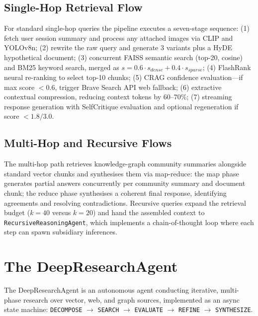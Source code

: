 \subsection{Single-Hop Retrieval Flow}
\label{subsec:single-hop}

For standard single-hop queries the pipeline executes a seven-stage sequence: (1) fetch user session summary and process any attached images via CLIP and YOLOv8n; (2) rewrite the raw query and generate 3 variants plus a HyDE hypothetical document; (3) concurrent FAISS semantic search (top-20, cosine) and BM25 keyword search, merged as $s = 0.6 \cdot s_{dense} + 0.4 \cdot s_{sparse}$; (4) FlashRank neural re-ranking to select top-10 chunks; (5) CRAG confidence evaluation---if max score $< 0.6$, trigger Brave Search API web fallback; (6) extractive contextual compression, reducing context tokens by 60--70\%; (7) streaming response generation with SelfCritique evaluation and optional regeneration if score $< 1.8/3.0$.

\subsection{Multi-Hop and Recursive Flows}
\label{subsec:multihop}

The multi-hop path retrieves knowledge-graph community summaries alongside standard vector chunks and synthesises them via map-reduce: the map phase generates partial answers concurrently per community summary and document chunk; the reduce phase synthesises a coherent final response, identifying agreements and resolving contradictions. Recursive queries expand the retrieval budget ($k=40$ versus $k=20$) and hand the assembled context to \texttt{RecursiveReasoningAgent}, which implements a chain-of-thought loop where each step can spawn subsidiary inferences.

\section{The DeepResearchAgent}
\label{sec:deepresearch}

The DeepResearchAgent is an autonomous agent conducting iterative, multi-phase research over vector, web, and graph sources, implemented as an async state machine: \texttt{DECOMPOSE} $\rightarrow$ \texttt{SEARCH} $\rightarrow$ \texttt{EVALUATE} $\rightarrow$ \texttt{REFINE} $\rightarrow$ \texttt{SYNTHESIZE}.

